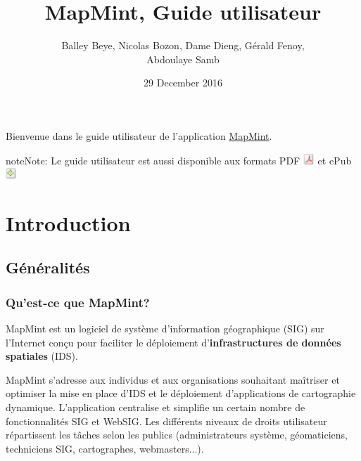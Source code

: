 \documentclass[letterpaper,10pt,french]{sphinxmanual}
\title{MapMint, Guide utilisateur}
\date{29 December 2016}
\author{Balley Beye, Nicolas Bozon, Dame Dieng, Gérald Fenoy, \\Abdoulaye Samb}
\begin{document}
\maketitle
\tableofcontents
{}\label{index::doc}


Bienvenue dans le guide utilisateur de l'application \href{http://mapmint.com}{MapMint}.

\begin{notice}{note}{Note:}
Le guide utilisateur est aussi disponible aux formats
PDF \includegraphics{pdf.png}  et ePub \includegraphics{epub.png}
\end{notice}


\chapter{Introduction}
\label{introduction/index:table-des-matieres}\label{introduction/index:home}\label{introduction/index::doc}\label{introduction/index:dashboard}\label{introduction/index:introduction}

\section{Généralités}
\label{introduction/introduction:generalites}\label{introduction/introduction::doc}\label{introduction/introduction:userguidegeneral}

\subsection{Qu’est-ce que MapMint?}
\label{introduction/introduction:quest-ce-que-mapmint}
MapMint est un logiciel de système d'information géographique (SIG) sur l'Internet  conçu pour faciliter le déploiement d'\textbf{infrastructures de données spatiales} (IDS).

MapMint s'adresse aux individus et aux organisations souhaitant maîtriser et optimiser la mise en place d'IDS et le déploiement d'applications de cartographie dynamique. L'application centralise et simplifie un certain nombre de fonctionnalités SIG et WebSIG. Les différents niveaux de droits utilisateur répartissent les tâches selon les publics (administrateurs système, géomaticiens, techniciens SIG, cartographes, webmasters...).
\end{document}
